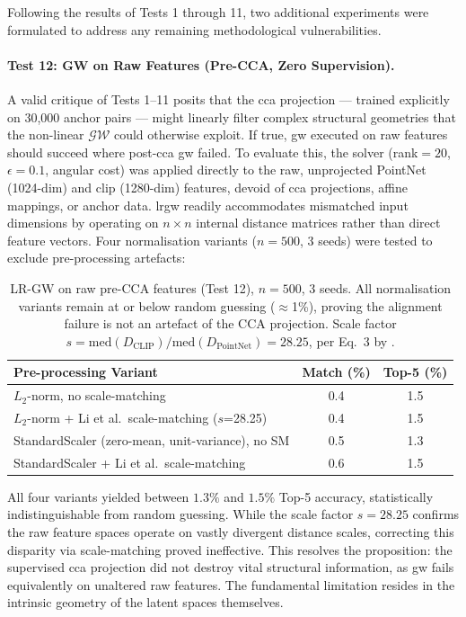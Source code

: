 Following the results of Tests 1 through 11, two additional experiments were formulated to address any remaining methodological vulnerabilities.

\paragraph{Test 12: GW on Raw Features (Pre-CCA, Zero Supervision).}
A valid critique of Tests 1--11 posits that the \gls{cca} projection --- trained explicitly on 30,000 anchor pairs --- might linearly filter complex structural geometries that the non-linear $\mathcal{GW}$ could otherwise exploit. If true, \gls{gw} executed on raw features should succeed where post-\gls{cca} \gls{gw} failed. To evaluate this, the solver (rank$=20$, $\epsilon=0.1$, angular cost) was applied directly to the raw, unprojected PointNet (1024-dim) and \gls{clip} (1280-dim) features, devoid of \gls{cca} projections, affine mappings, or anchor data. \gls{lrgw} readily accommodates mismatched input dimensions by operating on $n \times n$ internal distance matrices rather than direct feature vectors. Four normalisation variants ($n=500$, 3 seeds) were tested to exclude pre-processing artefacts:

\begin{table}[htpb]
\centering
\small
\begin{tabular}{lcc}
\toprule
\textbf{Pre-processing Variant} & \textbf{Match (\%)} & \textbf{Top-5 (\%)} \\
\midrule
$L_2$-norm, no scale-matching                        & 0.4 & 1.5 \\
$L_2$-norm + Li et al.\ scale-matching ($s$=28.25)  & 0.4 & 1.5 \\
StandardScaler (zero-mean, unit-variance), no SM     & 0.5 & 1.3 \\
StandardScaler + Li et al.\ scale-matching           & 0.6 & 1.5 \\
\bottomrule
\end{tabular}
\caption{LR-GW on raw pre-CCA features (Test 12), $n=500$, 3 seeds. All
normalisation variants remain at or below random guessing ($\approx$1\%),
proving the alignment failure is not an artefact of the CCA projection.
Scale factor $s = \text{med}(D_{\text{CLIP}})/\text{med}(D_{\text{PointNet}}) = 28.25$,
per Eq.~3 by \textcite{li2026scale}.}
\label{tab:raw_features_test}
\end{table}

All four variants yielded between $1.3\%$ and $1.5\%$ Top-5 accuracy, statistically indistinguishable from random guessing. While the scale factor $s = 28.25$ confirms the raw feature spaces operate on vastly divergent distance scales, correcting this disparity via scale-matching proved ineffective. This resolves the proposition: the supervised \gls{cca} projection did not destroy vital structural information, as \gls{gw} fails equivalently on unaltered raw features. The fundamental limitation resides in the intrinsic geometry of the latent spaces themselves.

